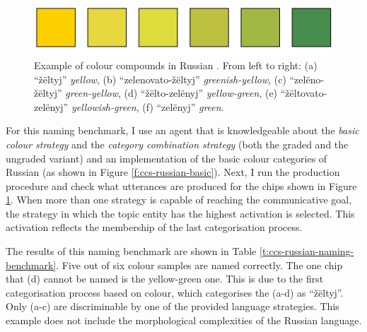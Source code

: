 \begin{figure}[htpb]
  \centering
  \includegraphics[width=.6\textwidth]{./category-combination/figures/russian-compounds.pdf}
  \caption[Example of colour compounds in Russian]{Example of colour
    compounds in Russian \citep{safuanova07russian}. From left to
    right: (a) ``\v z\"eltyj'' \emph{yellow}, (b) ``zelenovato-\v z\"eltyj'' 
    \emph{greenish-yellow}, (c) ``zel\"eno-\v z\"eltyj'' \emph{green-yellow},
    (d) ``\v z\"elto-zel\"enyj'' \emph{yellow-green}, (e) ``\v z\"eltovato-zel\"enyj''
    \emph{yellowish-green}, (f) ``zel\"enyj'' \emph{green}.}
  \label{f:ccs-russian-compounds}
\end{figure}

For this naming benchmark, 
I use an agent that is knowledgeable about
the \emph{basic colour strategy} and the \emph{category combination
  strategy} (both the graded and the ungraded variant) and an implementation of the
basic colour categories of Russian (as shown in Figure
\ref{f:ccs-russian-basic}). Next, I run the production procedure and
check what utterances are produced for the chips shown in Figure
\ref{f:ccs-russian-compounds}. When more than one strategy is capable
of reaching the communicative goal, the strategy in which the topic
entity has the highest activation is selected. This activation
reflects the membership of the last categorisation process.

The results of this naming benchmark are shown in Table
\ref{t:ccs-russian-naming-benchmark}. Five out of six colour samples
are named correctly. The one chip that (d) cannot be named is the
yellow-green one. This is due to the first categorisation process
based on colour, which categorises the (a-d) as ``\v z\"eltyj''. Only (a-c)
are discriminable by one of the provided language strategies. This
example does not include the morphological complexities of the Russian
language.

